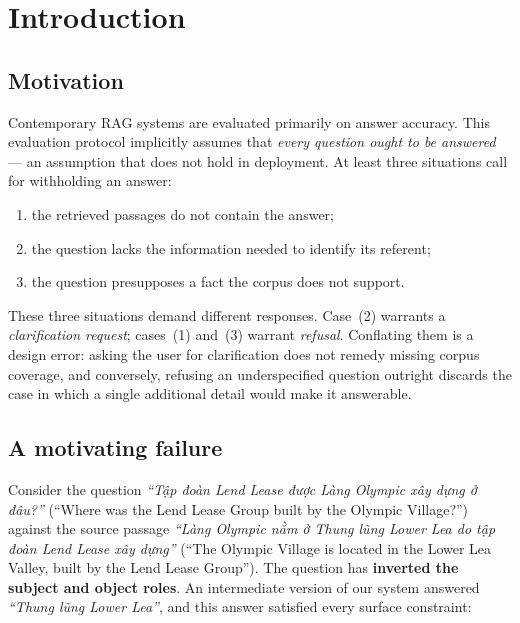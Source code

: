 \documentclass[conference]{IEEEtran}
\begin{document}
\section{Introduction}

\subsection{Motivation}

Contemporary RAG systems are evaluated primarily on answer accuracy. This
evaluation protocol implicitly assumes that \emph{every question ought to be
answered} --- an assumption that does not hold in deployment. At least three
situations call for withholding an answer:

\begin{enumerate}
  \item the retrieved passages do not contain the answer;
  \item the question lacks the information needed to identify its referent;
  \item the question presupposes a fact the corpus does not support.
\end{enumerate}

These three situations demand different responses. Case~(2) warrants a
\emph{clarification request}; cases~(1) and~(3) warrant \emph{refusal}. Conflating
them is a design error: asking the user for clarification does not remedy missing
corpus coverage, and conversely, refusing an underspecified question outright
discards the case in which a single additional detail would make it answerable.

\subsection{A motivating failure}
\label{sec:motivating}

Consider the question \emph{``Tập đoàn Lend Lease được Làng Olympic xây dựng ở
đâu?''} (``Where was the Lend Lease Group built by the Olympic Village?'')
against the source passage \emph{``Làng Olympic nằm ở Thung lũng Lower Lea do tập
đoàn Lend Lease xây dựng''} (``The Olympic Village is located in the Lower Lea
Valley, built by the Lend Lease Group''). The question has \textbf{inverted the
subject and object roles}. An intermediate version of our system answered
\emph{``Thung lũng Lower Lea''}, and this answer satisfied every surface
constraint:
\end{document}
